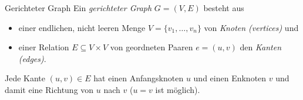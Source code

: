 \documentclass[german]{../spicker}
\begin{document}
\begin{defi}{Gerichteter Graph}
    Ein \emph{gerichteter Graph} $G = (V, E)$ besteht aus
    \begin{itemize}
        \item einer endlichen, nicht leeren Menge $V = \{v_1, \ldots, v_n\}$ von \emph{Knoten (vertices)} und
        \item einer Relation $E \subseteq V \times V$ von geordneten Paaren $e = (u, v)$ den \emph{Kanten (edges)}.
    \end{itemize}

    Jede Kante $(u,v) \in E$ hat einen Anfangsknoten $u$ und einen Enknoten $v$ und damit eine Richtung von $u$ nach $v$ ($u=v$ ist möglich).

    \begin{center}
    \end{center}
\end{defi}
\end{document}
